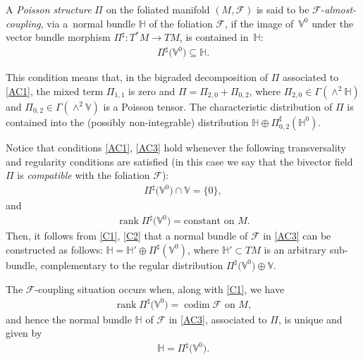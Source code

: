 \documentclass[10pt,a4paper]{amsart}
\numberwithin{equation}{section}
\begin{document}
\begin{Definition}
A \emph{Poisson structure} $\Pi$ on the foliated manifold $(M,\mathcal{F})$ is said to be $\mathcal{F}$-\emph{almost-coupling}, via a~normal bundle $\mathbb{H}$ of the foliation $\mathcal{F}$, if the image of~$\mathbb{V}^{0}$ under the vector bundle morphism $\Pi^{\sharp}\colon T^{\ast}M\rightarrow TM$, is contained in~$\mathbb{H}$:
\begin{gather}\label{AC3}
\Pi^{\sharp}\big(\mathbb{V}^{0}\big)\subseteq\mathbb{H}.
\end{gather}
\end{Definition}

This condition means that, in the bigraded decomposition of $\Pi$ associated to \eqref{AC1}, the mixed term $\Pi_{1,1}$ is zero and $\Pi=\Pi_{2,0}+\Pi_{0,2}$, where $\Pi_{2,0}\in\Gamma(\wedge^{2}\mathbb{H})$ and $\Pi_{0,2}\in\Gamma(\wedge^{2}\mathbb{V})$ is a Poisson tensor. The characteristic distribution of $\Pi$ is contained into the (possibly non-integrable) distribution $\mathbb{H}\oplus\Pi_{0,2}^{\sharp}(\mathbb{H}^{0})$.
\begin{Remark}
Notice that conditions \eqref{AC1}, \eqref{AC3} hold whenever the following transversality and regularity conditions are satisf\/ied (in this case we say that the bivector f\/ield $\Pi$ is \emph{compatible} with the foliation $\mathcal{F}$):
\begin{gather}\label{C1}
\Pi^{\sharp}\big(\mathbb{V}^{0}\big)\cap\mathbb{V}=\{0\} ,
\end{gather}
and
\begin{gather}\label{C2}
\operatorname{rank}\Pi^{\sharp}\big(\mathbb{V}^{0}\big)=\mbox{constant on }M.
\end{gather}
Then, it follows from \eqref{C1}, \eqref{C2} that a normal bundle of $\mathcal{F}$ in \eqref{AC3} can be constructed as follows: $\mathbb{H}=\mathbb{H}'\oplus\Pi^{\sharp}(\mathbb{V}^{0})$, where $\mathbb{H}'\subset TM$ is an arbitrary sub-bundle, complementary to the regular distribution $\Pi^{\sharp}\big(\mathbb{V}^{0}\big)\oplus\mathbb{V}$.
\end{Remark}
The $\mathcal{F}$-coupling situation occurs when, along with \eqref{C1}, we have
\begin{gather*}%
\operatorname{rank}\Pi^{\sharp}\big(\mathbb{V}^{0}\big)=\operatorname{codim}\mathcal{F}\mbox{ on }M,
\end{gather*}
and hence the normal bundle $\mathbb{H}$ of $\mathcal{F}$ in \eqref{AC3}, associated to $\Pi$, is unique and given by
\begin{gather}\label{CC2}
\mathbb{H}=\Pi^{\sharp}\big(\mathbb{V}^{0}\big).
\end{gather}
\end{document}
